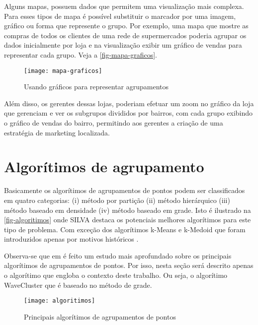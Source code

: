 	Alguns mapas, possuem dados que permitem uma visualização mais complexa. Para esses tipos de mapa é possível substituir o marcador por uma imagem, gráfico ou forma que represente o grupo.  Por exemplo, uma mapa que mostre as compras de todos os clientes de uma rede de supermercados poderia agrupar os dados inicialmente por loja e na visualização exibir um gráfico de vendas para representar cada grupo. Veja a \autoref{fig-mapa-graficos}.
	
\begin{figure}[htb]
	\caption{\label{fig-mapa-graficos}Usando gráficos para representar agrupamentos}
	\begin{center}
	    \texttt{[image: mapa-graficos]}
	\end{center}
\end{figure}

	Além disso, os gerentes dessas lojas,  poderiam efetuar um zoom no gráfico da loja que gerenciam e ver os subgrupos divididos por bairros, com cada grupo exibindo o gráfico de vendas do bairro, permitindo aos gerentes a criação de uma estratégia de marketing localizada.
	
\section{Algorítimos de agrupamento}	
	Basicamente os algorítimos de agrupamentos de pontos podem ser classificados em quatro categorias: (i) método por partição (ii) método hierárquico (iii) método baseado em densidade (iv) método baseado em grade. Isto é ilustrado na \autoref{fig-algoritimos} onde SILVA destaca os potenciais melhores algorítimos para este tipo de problema. Com exceção dos algorítimos k-Means e k-Medoid que foram introduzidos apenas por motivos históricos \cite[35]{silva2010solap+}.
	
	Observa-se que em \cite[capítulo 2]{silva2010solap+} é feito um estudo mais aprofundado sobre os principais algorítimos de agrupamentos de pontos. Por isso, nesta seção será descrito apenas o algorítimo que engloba o contexto deste trabalho. Ou seja, o algorítimo WaveCluster que é baseado no método de grade. 
		
\begin{figure}[htb]
	\caption{\label{fig-algoritimos}Principais algorítimos de agrupamentos de pontos}
	\begin{center}
	    \texttt{[image: algoritimos]}
	\end{center}
\end{figure}


